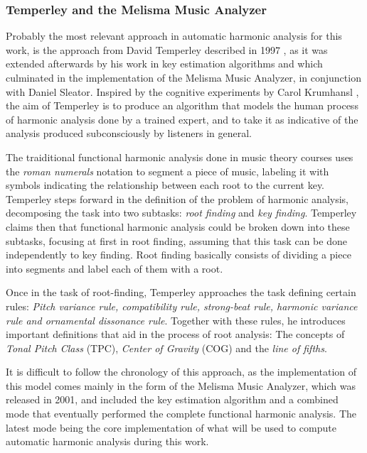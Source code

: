     \subsubsection{Temperley and the Melisma Music Analyzer}
    Probably the most relevant approach in automatic harmonic analysis for this work, is the approach from David Temperley described in 1997 \cite{temperley1997algorithm}, as it was extended afterwards by his work in key estimation algorithms and which culminated in the implementation of the Melisma Music Analyzer, in conjunction with Daniel Sleator.
    Inspired by the cognitive experiments by Carol Krumhansl \cite{krumhansl2001cognitive}, the aim of Temperley is to produce an algorithm that models the human process of harmonic analysis done by a trained expert, and to take it as indicative of the analysis produced subconsciously by listeners in general.

		The traiditional functional harmonic analysis done in music theory courses uses the \emph{roman numerals} notation to segment a piece of music, labeling it with symbols indicating the relationship between each root to the current key. Temperley steps forward in the definition of the problem of harmonic analysis, decomposing the task into two subtasks: \emph{root finding} and \emph{key finding}. Temperley claims then that functional harmonic analysis could be broken down into these subtasks, focusing at first in root finding, assuming that this task can be done independently to key finding. Root finding basically consists of dividing a piece into segments and label each of them with a root.

    Once in the task of root-finding, Temperley approaches the task defining certain rules: \emph{Pitch variance rule, compatibility rule, strong-beat rule, harmonic variance rule and ornamental dissonance rule}. Together with these rules, he introduces important definitions that aid in the process of root analysis: The concepts of \emph{Tonal Pitch Class} (TPC), \emph{Center of Gravity} (COG) and the \emph{line of fifths}.

    It is difficult to follow the chronology of this approach, as the implementation of this model comes mainly in the form of the Melisma Music Analyzer, which was released in 2001, and included the key estimation algorithm and a combined mode that eventually performed the complete functional harmonic analysis. The latest mode being the core implementation of what will be used to compute automatic harmonic analysis during this work.

